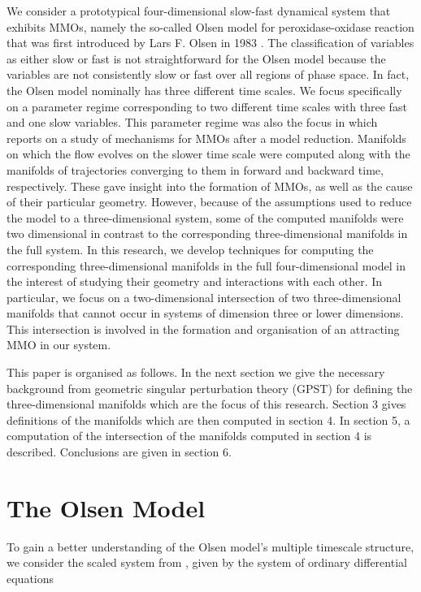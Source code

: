 \documentclass{ws-ijbc}
\begin{document}
We consider a prototypical four-dimensional slow-fast dynamical system that exhibits MMOs, namely the so-called Olsen model for peroxidase-oxidase reaction that was first introduced by Lars F. Olsen in 1983  \cite{Olsen}.  The classification of variables as either slow or fast is not straightforward for the Olsen model because the variables are not consistently slow or fast over all regions of phase space.  In fact, the Olsen model nominally has three different time scales.  We focus specifically on a parameter regime corresponding to two different time scales with three fast and one slow variables.  This parameter regime was also the focus in \cite{QSSA} which reports on a study of mechanisms for MMOs after a model reduction.  Manifolds on which the flow evolves on the slower time scale were computed along with the manifolds of trajectories converging to them in forward and backward time, respectively.  These gave insight into the formation of MMOs, as well as the cause of their particular geometry.  However, because of the assumptions used to reduce the model to a three-dimensional system, some of the computed manifolds were two dimensional in contrast to the corresponding three-dimensional manifolds in the full system.  In this research, we develop techniques for computing the corresponding three-dimensional manifolds in the full four-dimensional model in the interest of studying their geometry and interactions with each other.  In particular, we focus on a two-dimensional intersection of two three-dimensional manifolds that cannot occur in systems of dimension three or lower dimensions.  This intersection is involved in the formation and organisation of an attracting MMO in our system.

This paper is organised as follows.  In the next section we give the necessary background from geometric singular perturbation theory (GPST) for defining the three-dimensional manifolds which are the focus of this research.  Section 3 gives definitions of the manifolds which are then computed in section 4.  In section 5, a computation of the intersection of the manifolds computed in section 4 is described.  Conclusions are given in section 6.

\section{The Olsen Model}

To gain a better understanding of the Olsen model's multiple timescale structure, we consider the scaled system from \cite{Rescaling}, given by the system of ordinary differential equations
    
\end{document}
